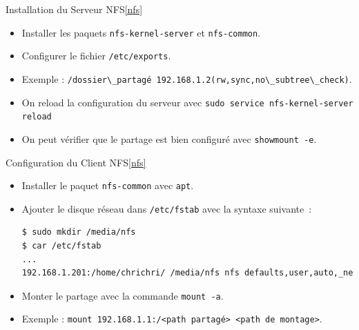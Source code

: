\documentclass{beamer}
\begin{document}
    \begin{frame}{Installation du Serveur NFS\cref{nfs}}
        \begin{itemize}
            \item Installer les paquets \lstinline{nfs-kernel-server} et \lstinline{nfs-common}.
            \item Configurer le fichier \lstinline{/etc/exports}.
            \item Exemple : \lstinline{/dossier\_partagé 192.168.1.2(rw,sync,no\_subtree\_check)}.
            \item On reload la configuration du serveur avec \lstinline{sudo service nfs-kernel-server reload}
            \item On peut vérifier que le partage est bien configuré avec \lstinline{showmount -e}.
        \end{itemize}
    \end{frame}

    \begin{frame}[fragile]{Configuration du Client NFS\cref{nfs}}
        \begin{itemize}
            \item Installer le paquet \lstinline{nfs-common} avec \lstinline{apt}.
            \item Ajouter le disque réseau dans \lstinline{/etc/fstab} avec la syntaxe suivante~:
            \begin{lstlisting}[language=bash,basicstyle=\tiny\ttfamily]
$ sudo mkdir /media/nfs
$ car /etc/fstab
...
192.168.1.201:/home/chrichri/ /media/nfs nfs defaults,user,auto,_netdev,bg 0 0
            \end{lstlisting}
            \item Monter le partage avec la commande \lstinline{mount -a}.
            \item Exemple : \lstinline{mount 192.168.1.1:/<path partagé> <path de montage>}.
        \end{itemize}
    \end{frame}
\end{document}
